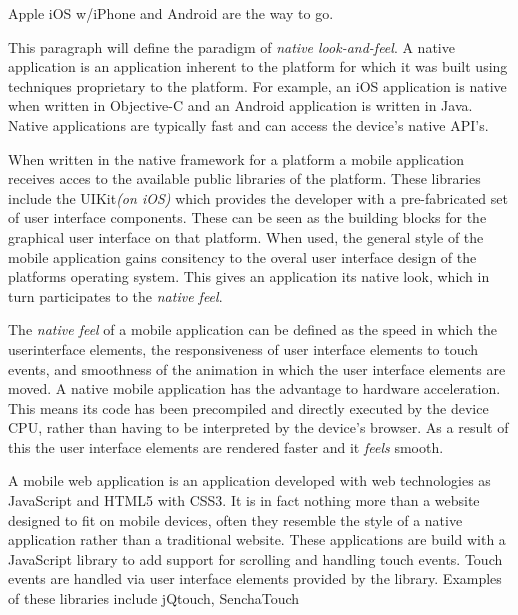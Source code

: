 
Apple iOS w/iPhone and Android are the way to go.


This paragraph will define the paradigm of \emph{native look-and-feel}. A native application is an application inherent to the platform for which it was built using techniques proprietary to the platform. For example, an iOS application is native when written in Objective-C and an Android application is written in Java.  Native applications are typically fast and can access the device's native API's.

When written in the native framework for a platform a mobile application receives acces to the available public libraries of the platform. These libraries include the UIKit\emph{(on iOS)} which provides the developer with a pre-fabricated set of user interface components. These can be seen as the building blocks for the graphical user interface on that platform. When used, the general style of the mobile application gains consitency to the overal user interface design of the platforms operating system. This gives an application its native look, which in turn participates to the \emph{native feel}.


The \emph{native feel} of a mobile application can be defined as the speed in which the userinterface elements, the responsiveness of user interface elements to touch events, and smoothness of the animation in which the user interface elements are moved. A native mobile application has the advantage to hardware acceleration. This means its code has been precompiled and directly executed by the device CPU, rather than having to be interpreted by the device's browser. As a result of this the user interface elements are rendered faster and it \emph{feels} smooth.


A mobile web application is an application developed with web technologies as JavaScript and HTML5 with CSS3. It is in fact nothing more than a website designed to fit on mobile devices, often they resemble the style of a native application rather than a traditional website. These applications are build with a JavaScript library to add support for scrolling and handling touch events. Touch events are handled via user interface elements provided by the library. Examples of these libraries include jQtouch, SenchaTouch

